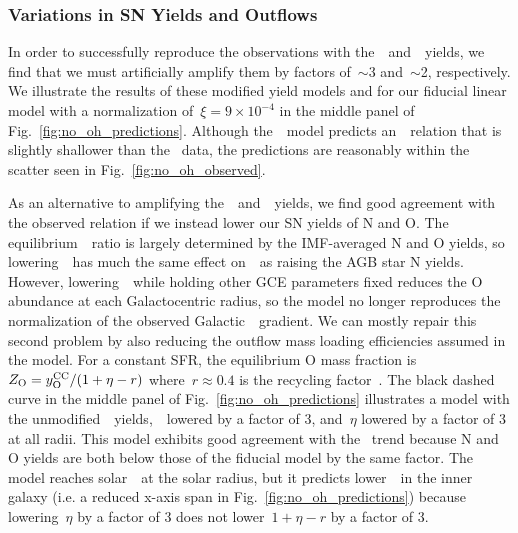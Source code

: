 \documentclass[ms.tex]{subfiles}
\begin{document}
\subsubsection{Variations in SN Yields and Outflows}
\label{sec:results:yields:variations}

In order to successfully reproduce the observations with
the~\cristallo~and~\ventura~yields, we find that we must artificially amplify
them by factors of~$\sim$3 and~$\sim$2, respectively.
We illustrate the results of these modified yield models and for our fiducial
linear model with a normalization of~$\xi = 9\times10^{-4}$ in the middle panel
of Fig.~\ref{fig:no_oh_predictions}.
Although the~\ventura~model predicts an~\ohno~relation that is slightly
shallower than the~\citet{Dopita2016} data, the predictions are
reasonably within the scatter seen in Fig.~\ref{fig:no_oh_observed}.
\par
As an alternative to amplifying the~\cristallo~and~\ventura~yields, we find
good agreement with the observed relation if we instead lower our SN yields
of N and O.
The equilibrium~\no~ratio is largely determined by the IMF-averaged N and O
yields, so lowering~~has much the same effect on~\no~as raising the AGB
star N yields.
However, lowering~~while holding other GCE parameters fixed reduces the
O abundance at each Galactocentric radius, so the model no longer reproduces
the normalization of the observed Galactic~\oh~gradient.
We can mostly repair this second problem by also reducing the outflow mass
loading efficiencies assumed in the model.
For a constant SFR, the equilibrium O mass fraction
is~$Z_\text{O} = y_\text{O}^\text{CC}/(1 + \eta - r)$ where~$r \approx 0.4$ is the recycling
factor~\citep{Weinberg2017}.
The black dashed curve in the middle panel of Fig.~\ref{fig:no_oh_predictions}
illustrates a model with the unmodified~\cristallo~yields,~~lowered by a
factor of 3, and~$\eta$ lowered by a factor of 3 at all radii.
This model exhibits good agreement with the~\citet{Dopita2016} trend because N
and O yields are both below those of the fiducial model by the same factor.
The model reaches solar~\oh~at the solar radius, but it predicts lower~\oh~in
the inner galaxy (i.e. a reduced x-axis span in
Fig.~\ref{fig:no_oh_predictions}) because lowering~$\eta$ by a factor of 3 does
not lower~$1 + \eta - r$ by a factor of 3.
\end{document}

